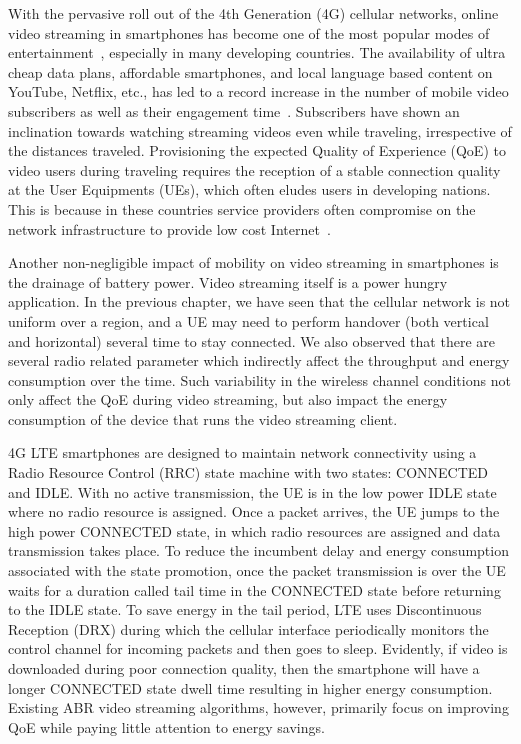With the pervasive roll out of the 4th Generation (4G) cellular networks, online video streaming in smartphones has become one of the most popular modes of entertainment~\cite{CISCO2019}, especially in many developing countries. The availability of ultra cheap data plans, affordable smartphones, and local
language based content on YouTube, Netflix, etc., has led to a record increase in the number of mobile video subscribers as well as their engagement time~\cite{Mobstat_2019}. Subscribers have shown an inclination towards watching streaming videos even while traveling, irrespective of the distances traveled. Provisioning the expected Quality of Experience (QoE) to video users during traveling requires the reception of a stable connection quality at the User Equipments (UEs), which often eludes users in developing nations. This is because in these countries service providers often compromise on the network infrastructure to provide low cost Internet~\cite{Poor_Inf_2019_2}. 

Another non-negligible impact of mobility on video streaming in smartphones is the drainage of battery power. Video streaming itself is a power hungry application. In the previous chapter, we have seen that the cellular network is not uniform over a region, and a UE may need to perform handover (both vertical and horizontal) several time to stay connected. We also observed that there are several radio related parameter which indirectly affect the throughput and energy consumption over the time. Such variability in the wireless channel conditions not only affect the QoE during video streaming, but also impact the energy consumption of the device that runs the video streaming client. 

4G LTE smartphones are designed to maintain network connectivity using a Radio Resource Control (RRC) state machine with two states: CONNECTED and IDLE. With
no active transmission, the UE is in the low power IDLE state where no radio resource is assigned. Once a packet arrives, the UE jumps to the high power CONNECTED state, in which radio resources are assigned and data transmission
takes place. To reduce the incumbent delay and energy consumption associated with the state promotion, once the packet transmission is over the UE waits for a duration called tail time in the CONNECTED state before returning to the IDLE state. To save energy in the tail period, LTE uses Discontinuous
Reception (DRX) during which the cellular interface periodically monitors the control channel for incoming packets and then goes to sleep. Evidently, if video is downloaded during poor connection quality, then the smartphone will
have a longer CONNECTED state dwell time resulting in higher energy consumption. Existing ABR video streaming algorithms, however, primarily focus on improving QoE while paying little attention to energy savings.

